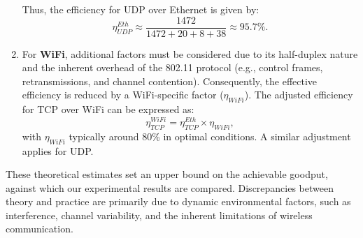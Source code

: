 \begin{enumerate}
                \noindent Thus, the efficiency for UDP over Ethernet is given by:
                \[
                \eta_{UDP}^{Eth} \approx \frac{1472}{1472 + 20 + 8 + 38} \approx 95.7\%.
                \]

            \item 
                For \textbf{WiFi}, additional factors must be considered due to its half-duplex nature and the inherent overhead of the 802.11 protocol (e.g., control frames, retransmissions, and channel contention). 
                Consequently, the effective efficiency is reduced by a WiFi-specific factor (\(\eta_{WiFi}\)). 
                The adjusted efficiency for TCP over WiFi can be expressed as:
                \[
                \eta_{TCP}^{WiFi} = \eta_{TCP}^{Eth} \times \eta_{WiFi},
                \]
                with \(\eta_{WiFi}\) typically around 80\% in optimal conditions. A similar adjustment applies for UDP.

        \end{enumerate}

        \noindent These theoretical estimates set an upper bound on the achievable goodput, against which our experimental results are compared. 
        Discrepancies between theory and practice are primarily due to dynamic environmental factors, such as interference, channel variability, and the inherent limitations of wireless communication.
